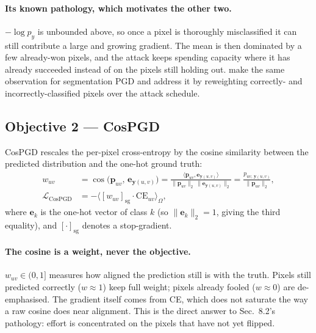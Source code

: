 \documentclass[11pt,a4paper]{article}
\newcommand{\sg}[1]{\left[#1\right]_{\mathrm{sg}}}
\begin{document}
\paragraph{Its known pathology, which motivates the other two.}
$-\log p_y$ is unbounded above, so once a pixel is thoroughly misclassified
it can still contribute a large and growing gradient. The mean is then
dominated by a few already-won pixels, and the attack keeps spending
capacity where it has already succeeded instead of on the pixels still
holding out. \citet{gu2022segpgd} make the same observation for segmentation
PGD and address it by reweighting correctly- and incorrectly-classified
pixels over the attack schedule.

\subsection{Objective 2 --- CosPGD}

CosPGD \citep{agnihotri2024cospgd} rescales the per-pixel cross-entropy by
the cosine similarity between the predicted distribution and the one-hot
ground truth:
\begin{align}
  w_{uv} &= \cos\!\big(\mathbf{p}_{uv},\,\mathbf{e}_{\mathbf{y}(u,v)}\big)
     = \frac{\langle\mathbf{p}_{uv},\mathbf{e}_{\mathbf{y}(u,v)}\rangle}
            {\|\mathbf{p}_{uv}\|_2\,\|\mathbf{e}_{\mathbf{y}(u,v)}\|_2}
     = \frac{p_{uv,\,\mathbf{y}(u,v)}}{\|\mathbf{p}_{uv}\|_2},
     \label{eq:cosw}\\
  \mathcal{L}_{\mathrm{CosPGD}}
     &= -\big\langle \sg{w_{uv}}\cdot\mathrm{CE}_{uv}\big\rangle_\Omega ,
  \label{eq:cospgd}
\end{align}
where $\mathbf{e}_k$ is the one-hot vector of class $k$ (so
$\|\mathbf{e}_k\|_2=1$, giving the third equality), and
$\sg{\cdot}$ denotes a stop-gradient.

\paragraph{The cosine is a weight, never the objective.}
$w_{uv}\in(0,1]$ measures how aligned the prediction still is with the
truth. Pixels still predicted correctly ($w\approx1$) keep full weight;
pixels already fooled ($w\approx0$) are de-emphasised. The gradient itself
comes from CE, which does not saturate the way a raw cosine does near
alignment. This is the direct answer to Sec.~8.2's pathology: effort is
concentrated on the pixels that have not yet flipped.
\end{document}
